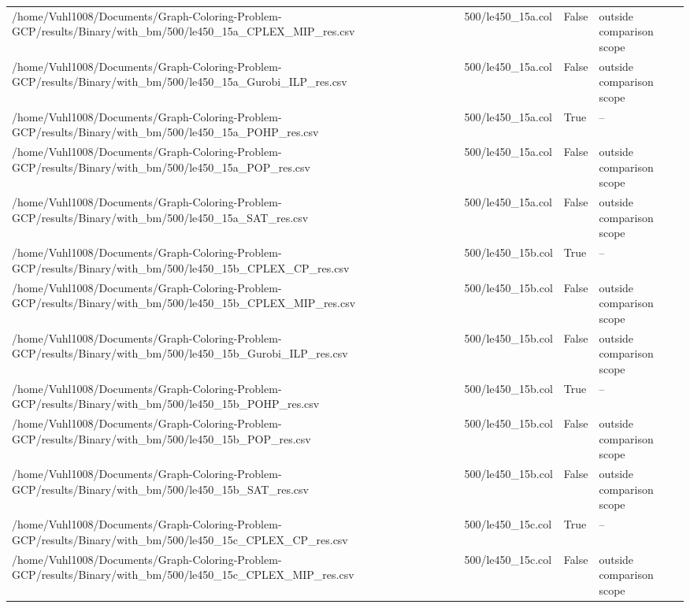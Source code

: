 \begin{table}[htbp]
\begin{tabular}{llll}
/home/Vuhl1008/Documents/Graph-Coloring-Problem-GCP/results/Binary/with\_bm/500/le450\_15a\_CPLEX\_MIP\_res.csv & 500/le450\_15a.col & False & outside comparison scope \\
/home/Vuhl1008/Documents/Graph-Coloring-Problem-GCP/results/Binary/with\_bm/500/le450\_15a\_Gurobi\_ILP\_res.csv & 500/le450\_15a.col & False & outside comparison scope \\
/home/Vuhl1008/Documents/Graph-Coloring-Problem-GCP/results/Binary/with\_bm/500/le450\_15a\_POHP\_res.csv & 500/le450\_15a.col & True & -- \\
/home/Vuhl1008/Documents/Graph-Coloring-Problem-GCP/results/Binary/with\_bm/500/le450\_15a\_POP\_res.csv & 500/le450\_15a.col & False & outside comparison scope \\
/home/Vuhl1008/Documents/Graph-Coloring-Problem-GCP/results/Binary/with\_bm/500/le450\_15a\_SAT\_res.csv & 500/le450\_15a.col & False & outside comparison scope \\
/home/Vuhl1008/Documents/Graph-Coloring-Problem-GCP/results/Binary/with\_bm/500/le450\_15b\_CPLEX\_CP\_res.csv & 500/le450\_15b.col & True & -- \\
/home/Vuhl1008/Documents/Graph-Coloring-Problem-GCP/results/Binary/with\_bm/500/le450\_15b\_CPLEX\_MIP\_res.csv & 500/le450\_15b.col & False & outside comparison scope \\
/home/Vuhl1008/Documents/Graph-Coloring-Problem-GCP/results/Binary/with\_bm/500/le450\_15b\_Gurobi\_ILP\_res.csv & 500/le450\_15b.col & False & outside comparison scope \\
/home/Vuhl1008/Documents/Graph-Coloring-Problem-GCP/results/Binary/with\_bm/500/le450\_15b\_POHP\_res.csv & 500/le450\_15b.col & True & -- \\
/home/Vuhl1008/Documents/Graph-Coloring-Problem-GCP/results/Binary/with\_bm/500/le450\_15b\_POP\_res.csv & 500/le450\_15b.col & False & outside comparison scope \\
/home/Vuhl1008/Documents/Graph-Coloring-Problem-GCP/results/Binary/with\_bm/500/le450\_15b\_SAT\_res.csv & 500/le450\_15b.col & False & outside comparison scope \\
/home/Vuhl1008/Documents/Graph-Coloring-Problem-GCP/results/Binary/with\_bm/500/le450\_15c\_CPLEX\_CP\_res.csv & 500/le450\_15c.col & True & -- \\
/home/Vuhl1008/Documents/Graph-Coloring-Problem-GCP/results/Binary/with\_bm/500/le450\_15c\_CPLEX\_MIP\_res.csv & 500/le450\_15c.col & False & outside comparison scope \\

\end{tabular}
\end{table}
